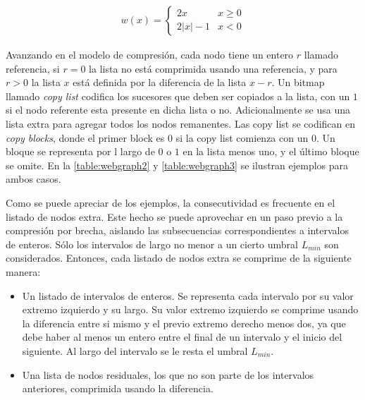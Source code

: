 \begin{align}
	w(x) =  \begin{cases}
					2x & x \geq 0 \\
					2|x| - 1 & x < 0
				\end{cases} 
\end{align}



Avanzando en el modelo de compresión, cada nodo tiene un entero $r$ llamado referencia, si $r = 0$ la lista no está comprimida usando una referencia, y para $r > 0$ la lista $x$ está definida por la diferencia de la lista $x - r$. Un bitmap llamado \textit{copy list} codifica los sucesores que deben ser copiados a la lista, con un $1$ si el nodo referente esta presente en dicha lista o no. Adicionalmente se usa una lista extra para agregar todos los nodos remanentes. Las copy list se codifican en \textit{copy blocks}, donde el primer block es $0$ si la copy list comienza con un $0$. Un bloque se representa por l largo de $0$ o $1$ en la lista menos uno, y el último bloque se omite. En la \autoref{table:webgraph2} y \autoref{table:webgraph3} se ilustran ejemplos para ambos casos.





Como se puede apreciar de los ejemplos, la consecutividad es frecuente en el listado de nodos extra. Este hecho se puede aprovechar en un paso previo a la compresión por brecha, aislando las subsecuencias correspondientes a intervalos de enteros. Sólo los intervalos de largo no menor a un cierto umbral $L_{min}$ son considerados. Entonces, cada listado de nodos extra se comprime de la siguiente manera:

\begin{itemize}
	\item Un listado de intervalos de enteros. Se representa cada intervalo por su valor extremo izquierdo y su largo. Su valor extremo izquierdo se comprime usando la diferencia entre si mismo y el previo extremo derecho menos dos, ya que debe haber al menos un entero entre el final de un intervalo y el inicio del siguiente. Al largo del intervalo se le resta el umbral $L_{min}$.
	\item Una lista de nodos residuales, los que no son parte de los intervalos anteriores, comprimida usando la diferencia.
\end{itemize}



